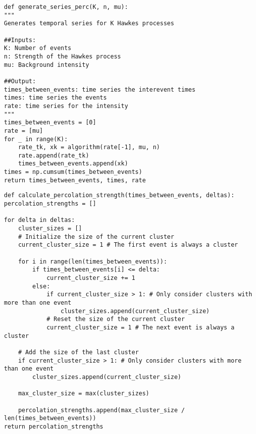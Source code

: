 \begin{lstlisting}[caption = {Series perc.}, label = {lst:}]
def generate_series_perc(K, n, mu):
"""
Generates temporal series for K Hawkes processes

##Inputs:
K: Number of events
n: Strength of the Hawkes process
mu: Background intensity 

##Output:
times_between_events: time series the interevent times
times: time series the events
rate: time series for the intensity
"""
times_between_events = [0]
rate = [mu]
for _ in range(K):
    rate_tk, xk = algorithm(rate[-1], mu, n)
    rate.append(rate_tk)
    times_between_events.append(xk)
times = np.cumsum(times_between_events)
return times_between_events, times, rate
\end{lstlisting}

\begin{lstlisting}[caption = {Percolations.}, label = {lst:}]
def calculate_percolation_strength(times_between_events, deltas):
percolation_strengths = []

for delta in deltas:
    cluster_sizes = []
    # Initialize the size of the current cluster
    current_cluster_size = 1 # The first event is always a cluster

    for i in range(len(times_between_events)):
        if times_between_events[i] <= delta:
            current_cluster_size += 1
        else:
            if current_cluster_size > 1: # Only consider clusters with more than one event
                cluster_sizes.append(current_cluster_size)
            # Reset the size of the current cluster
            current_cluster_size = 1 # The next event is always a cluster

    # Add the size of the last cluster
    if current_cluster_size > 1: # Only consider clusters with more than one event
        cluster_sizes.append(current_cluster_size)

    max_cluster_size = max(cluster_sizes) 

    percolation_strengths.append(max_cluster_size / len(times_between_events))
return percolation_strengths
\end{lstlisting}
